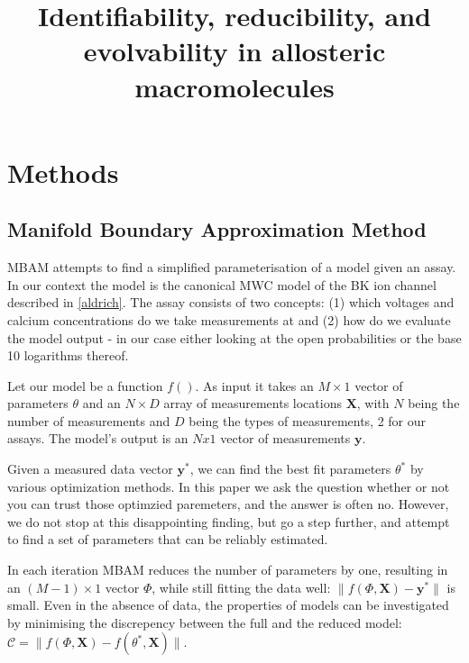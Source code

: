 \documentclass[10pt]{amsart}
\begin{document}
\title{Identifiability, reducibility, and evolvability in allosteric macromolecules}


\date{\vspace{-.1in}}

\maketitle


\section{Methods}


\subsection{Manifold Boundary Approximation Method}
MBAM attempts to find a simplified parameterisation of a model given an assay. In our context the model is the canonical MWC model of the BK ion channel described in \eqref{aldrich}. The assay consists of two concepts: (1) which voltages and calcium concentrations do we take measurements at and (2) how do we evaluate the model output - in our case either looking at the open probabilities or the base 10 logarithms thereof.

Let our model be a function $f()$. As input it takes an $M\times 1$ vector of parameters $\theta$ and an $N\times D$ array of measurements locations $\mathbf{X}$, with $N$ being the number of measurements and $D$ being the types of measurements, 2 for our assays.
The model's output is an $Nx1$ vector of measurements $\mathbf{y}$.

Given a measured data vector $\mathbf{y^*}$, we can find the best fit parameters $\theta^*$ by various optimization methods. In this paper we ask the question whether or not you can trust those optimzied paremeters, and the answer is often no. However, we do not stop at this disappointing finding, but go a step further, and attempt to find a set of parameters that can be reliably estimated.

In each iteration MBAM reduces the number of parameters by one, resulting in an $(M-1) \times 1$ vector $\Phi$, while still fitting the data well: $\|f(\Phi, \mathbf{X}) - \mathbf{y^*}\|$ is small. Even in the absence of data, the properties of models can be investigated by minimising the discrepency between the full and the reduced model: $\mathcal{C} = \|f(\Phi, \mathbf{X}) - f(\theta^*, \mathbf{X})\|$.
\end{document}
